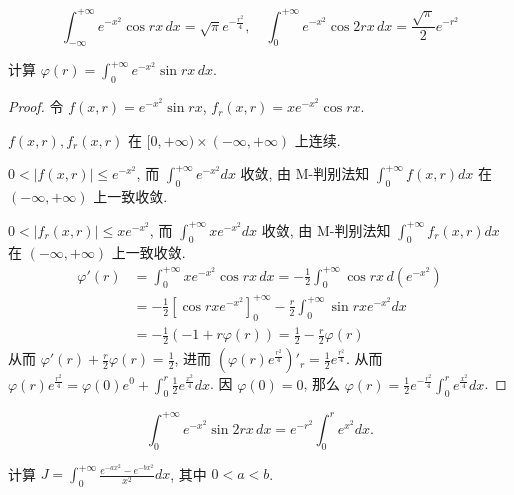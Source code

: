 \documentclass[lang=cn,newtx,10pt,scheme=chinese]{elegantbook}
\begin{document}
\begin{corollary*}
$$ \int_{-\infty}^{+\infty} e^{-x^2} \cos rx \, dx = \sqrt{\pi} e^{-\frac{r^2}{4}}, \quad \int_{0}^{+\infty} e^{-x^2} \cos 2rx \, dx = \frac{\sqrt{\pi}}{2} e^{-r^2} $$
\end{corollary*}

\begin{example}[$\bigstar \bigstar$]
计算 $\varphi(r) = \int_{0}^{+\infty} e^{-x^2} \sin rx \, dx$.
\end{example}

\begin{proof}
令 $f(x,r) = e^{-x^2}\sin rx$, $f_r(x,r) = x e^{-x^2}\cos rx$.

$f(x,r), f_r(x,r)$ 在 $[0, +\infty) \times (-\infty, +\infty)$ 上连续.

$0 < |f(x,r)| \le e^{-x^2}$, 而 $\int_0^{+\infty} e^{-x^2} dx$ 收敛, 由 M-判别法知 $\int_0^{+\infty} f(x,r) dx$ 在 $(-\infty, +\infty)$ 上一致收敛.

$0 < |f_r(x,r)| \le x e^{-x^2}$, 而 $\int_0^{+\infty} x e^{-x^2} dx$ 收敛, 由 M-判别法知 $\int_0^{+\infty} f_r(x,r) dx$ 在 $(-\infty, +\infty)$ 上一致收敛.
\begin{align*}
\varphi'(r) &= \int_0^{+\infty} x e^{-x^2} \cos rx \, dx = -\frac{1}{2} \int_0^{+\infty} \cos rx \, d(e^{-x^2}) \\
&= -\frac{1}{2} \left[ \cos rx e^{-x^2} \right]_0^{+\infty} - \frac{r}{2} \int_0^{+\infty} \sin rx e^{-x^2} dx \\
&= -\frac{1}{2}(-1+r\varphi(r)) = \frac{1}{2} - \frac{r}{2}\varphi(r)
\end{align*}
从而 $\varphi'(r) + \frac{r}{2} \varphi(r) = \frac{1}{2}$, 进而 $\left( \varphi(r) e^{\frac{r^2}{4}} \right)'_r = \frac{1}{2} e^{\frac{r^2}{4}}$.
从而 $\varphi(r) e^{\frac{r^2}{4}} = \varphi(0) e^0 + \int_0^r \frac{1}{2} e^{\frac{x^2}{4}} dx$.
因 $\varphi(0) = 0$, 那么 $\varphi(r) = \frac{1}{2} e^{-\frac{r^2}{4}} \int_0^r e^{\frac{x^2}{4}} dx$.
\end{proof}

\begin{corollary*}
$$ \int_{0}^{+\infty} e^{-x^2} \sin 2rx \, dx = e^{-r^2} \int_0^r e^{x^2} dx. $$
\end{corollary*}

\begin{example}
计算 $J = \int_{0}^{+\infty} \frac{e^{-ax^2} - e^{-bx^2}}{x^2} dx$, 其中 $0<a<b$.
\end{example}
\end{document}
